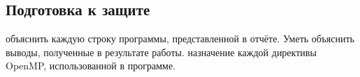 { %
	\subsection{Подготовка к защите}
	\Large
	\begin{enumerate}
		 объяснить каждую строку программы, представленной в отчёте. Уметь объяснить выводы, полученные в результате работы.
		 назначение каждой директивы OpenMP, использованной в программе.
	\end{enumerate}
}